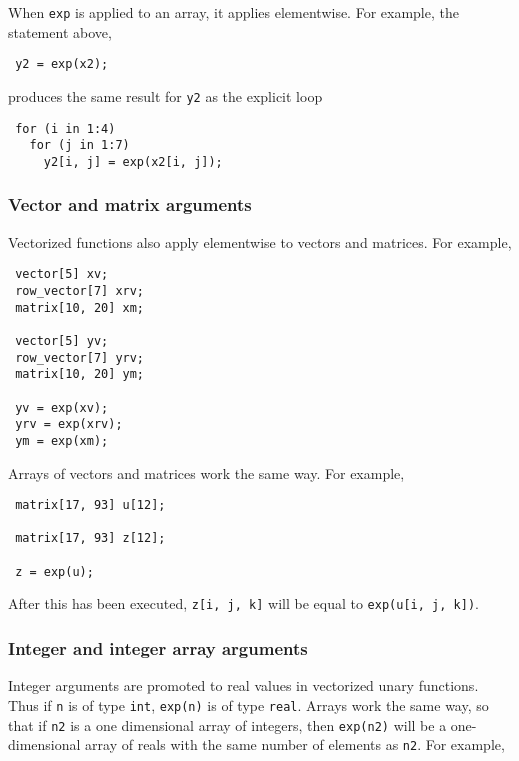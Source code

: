 \documentclass[
  10pt,
]{book}
\begin{document}
When \texttt{exp} is applied to an array, it applies elementwise. For
example, the statement above,

\begin{verbatim}
 y2 = exp(x2);
\end{verbatim}

produces the same result for \texttt{y2} as the explicit loop

\begin{verbatim}
 for (i in 1:4)
   for (j in 1:7)
     y2[i, j] = exp(x2[i, j]);
\end{verbatim}

\hypertarget{vector-and-matrix-arguments}{%
\subsubsection{Vector and matrix arguments}\label{vector-and-matrix-arguments}}

Vectorized functions also apply elementwise to vectors and matrices.
For example,

\begin{verbatim}
 vector[5] xv;
 row_vector[7] xrv;
 matrix[10, 20] xm;
 
 vector[5] yv;
 row_vector[7] yrv;
 matrix[10, 20] ym;
 
 yv = exp(xv);
 yrv = exp(xrv);
 ym = exp(xm);
\end{verbatim}

Arrays of vectors and matrices work the same way. For example,

\begin{verbatim}
 matrix[17, 93] u[12];
 
 matrix[17, 93] z[12];
 
 z = exp(u);
\end{verbatim}

After this has been executed, \texttt{z{[}i,\ j,\ k{]}} will be equal to \texttt{exp(u{[}i,\ j,\ k{]})}.

\hypertarget{integer-and-integer-array-arguments}{%
\subsubsection{Integer and integer array arguments}\label{integer-and-integer-array-arguments}}

Integer arguments are promoted to real values in vectorized unary
functions. Thus if \texttt{n} is of type \texttt{int}, \texttt{exp(n)} is of type \texttt{real}.
Arrays work the same way, so that if \texttt{n2} is a one dimensional array
of integers, then \texttt{exp(n2)} will be a one-dimensional array of reals
with the same number of elements as \texttt{n2}. For example,
\end{document}
